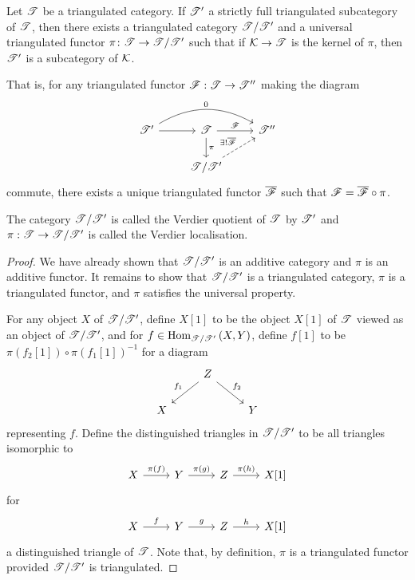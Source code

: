 \documentclass[dissertation.tex]{subfiles}
\begin{document}
\begin{thm}[\cite{NeemanTCats}]
  Let $\mathscr{T}$ be a triangulated category.
  If $\mathscr{T}^\prime$ a strictly full triangulated subcategory of $\mathscr{T}$, then there exists a triangulated category $\mathscr{T}/\mathscr{T}^\prime$ and a universal triangulated functor $\pi \colon \mathscr{T} \rightarrow \mathscr{T}/\mathscr{T}^\prime$ such that if $\mathcal{K} \rightarrow \mathscr{T}$ is the kernel of $\pi$, then $\mathscr{T}^\prime$ is a subcategory of $\mathcal{K}$.

  That is, for any triangulated functor $\mathscr{F} : \mathscr{T} \rightarrow \mathscr{T}^{\prime\prime}$ making the diagram
  $$\begin{tikzcd}
    \T^\prime \arrow{r}\arrow[bend left]{rr}{0} & \T \arrow{d}{\pi}\arrow{r}{\F} & \T^{\prime\prime}\\
    & \T/\T^\prime \arrow[dashed]{ur}{\exists !\overline{\F}}
  \end{tikzcd}$$
  commute, there exists a unique triangulated functor $\overline{\mathscr{F}}$ such that $\mathscr{F} = \overline{\mathscr{F}} \circ \pi$.
  
  The category $\mathscr{T}/\mathscr{T}^\prime$ is called the Verdier quotient of $\mathscr{T}$ by $\mathscr{T}^\prime$ and $\pi : \mathscr{T} \rightarrow \mathscr{T}/\mathscr{T}^\prime$ is called the Verdier localisation.
  
  \begin{proof}
    We have already shown that $\mathscr{T}/\mathscr{T}^\prime$ is an additive category and $\pi$ is an additive functor.
    It remains to show that $\mathscr{T}/\mathscr{T}^\prime$ is a triangulated category, $\pi$ is a triangulated functor, and $\pi$ satisfies the universal property.
    
    For any object $X$ of $\mathscr{T}/\mathscr{T}^\prime$, define $X[1]$ to be the object $X[1]$ of $\mathscr{T}$ viewed as an object of $\mathscr{T}/\mathscr{T}^\prime$, and for $f \in \operatorname{Hom}_{\mathscr{T}/\mathscr{T}^\prime}\left(X,Y\right)$, define $f[1]$ to be $\pi(f_2[1]) \circ \pi(f_1[1])^{-1}$ for a diagram
    $$\begin{tikzcd}
      & Z \arrow[swap]{ld}{f_1}\arrow{rd}{f_2}\\
      X & & Y
    \end{tikzcd}$$
    representing $f$.
    Define the distinguished triangles in $\mathscr{T}/\mathscr{T}^\prime$ to be all triangles isomorphic to 
    $$\begin{tikzcd}
      X \arrow{r}{\pi(f)} & Y \arrow{r}{\pi(g)} & Z \arrow{r}{\pi(h)} & X[1]
    \end{tikzcd}$$
    for
    $$\begin{tikzcd}
      X \arrow{r}{f} & Y \arrow{r}{g} & Z \arrow{r}{h} & X[1]
    \end{tikzcd}$$
    a distinguished triangle of $\mathscr{T}$.
    Note that, by definition, $\pi$ is a triangulated functor provided $\mathscr{T}/\mathscr{T}^\prime$ is triangulated.
    

\end{proof}
\end{thm}
\end{document}
